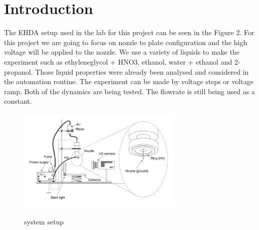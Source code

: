 \section{Introduction}

The EHDA setup used in the lab for this project can be seen in the Figure 2.
For this project we are going to focus on nozzle to plate configuration and the high voltage
will be applied to the nozzle.
We use a variety of liquids to make the experiment such as ethyleneglycol + HNO3, ethanol, water + ethanol and 2-propanol.
Those liquid properties were already been analysed and considered in the automation routine.
The experiment can be made by voltage steps or voltage ramp. Both of the dynamics are being tested.
The flowrate is still being used as a constant.

\begin{figure}[H]
    \center
    \includegraphics[width=8cm]{images/system_setup.png}
    \label{img3}
    \caption{system setup}
\end{figure}